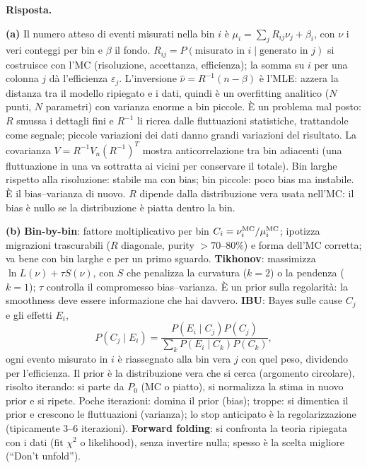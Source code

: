 \documentclass[11pt,a4paper]{article}
\newcommand{\Ris}[1]{\noindent\textbf{Risposta.}\par\nopagebreak #1}
\begin{document}
\Ris{
\textbf{(a)} Il numero atteso di eventi misurati nella bin $i$ \`e $\mu_i=\sum_j R_{ij}\nu_j+\beta_i$, con $\nu$ i veri conteggi per bin e $\beta$ il fondo.
$R_{ij}=P(\text{misurato in }i\mid\text{generato in }j)$ si costruisce con l'MC (risoluzione, accettanza, efficienza); la somma su $i$ per una colonna $j$ d\`a l'efficienza $\varepsilon_j$.
L'inversione $\hat\nu=R^{-1}(n-\beta)$ \`e l'MLE: azzera la distanza tra il modello ripiegato e i dati, quindi \`e un overfitting analitico ($N$ punti, $N$ parametri) con varianza enorme a bin piccole.
\`E un problema mal posto: $R$ smussa i dettagli fini e $R^{-1}$ li ricrea dalle fluttuazioni statistiche, trattandole come segnale; piccole variazioni dei dati danno grandi variazioni del risultato.
La covarianza $V=R^{-1}V_n(R^{-1})^T$ mostra anticorrelazione tra bin adiacenti (una fluttuazione in una va sottratta ai vicini per conservare il totale).
Bin larghe rispetto alla risoluzione: stabile ma con bias; bin piccole: poco bias ma instabile. \`E il bias--varianza di nuovo.
$R$ dipende dalla distribuzione vera usata nell'MC: il bias \`e nullo se la distribuzione \`e piatta dentro la bin.

\textbf{(b)} \textbf{Bin-by-bin}: fattore moltiplicativo per bin $C_i=\nu_i^{\rm MC}/\mu_i^{\rm MC}$; ipotizza migrazioni trascurabili ($R$ diagonale, purity $>70$--$80\%$) e forma dell'MC corretta; va bene con bin larghe e per un primo sguardo.
\textbf{Tikhonov}: massimizza $\ln L(\nu)+\tau S(\nu)$, con $S$ che penalizza la curvatura ($k=2$) o la pendenza ($k=1$); $\tau$ controlla il compromesso bias--varianza. \`E un prior sulla regolarit\`a: la smoothness deve essere informazione che hai davvero.
\textbf{IBU}: Bayes sulle cause $C_j$ e gli effetti $E_i$,
\[
P(C_j\mid E_i)=\frac{P(E_i\mid C_j)P(C_j)}{\sum_k P(E_i\mid C_k)P(C_k)},
\]
ogni evento misurato in $i$ \`e riassegnato alla bin vera $j$ con quel peso, dividendo per l'efficienza.
Il prior \`e la distribuzione vera che si cerca (argomento circolare), risolto iterando: si parte da $P_0$ (MC o piatto), si normalizza la stima in nuovo prior e si ripete.
Poche iterazioni: domina il prior (bias); troppe: si dimentica il prior e crescono le fluttuazioni (varianza); lo stop anticipato \`e la regolarizzazione (tipicamente $3$--$6$ iterazioni).
\textbf{Forward folding}: si confronta la teoria ripiegata con i dati (fit $\chi^2$ o likelihood), senza invertire nulla; spesso \`e la scelta migliore (``Don't unfold'').

}
\end{document}
